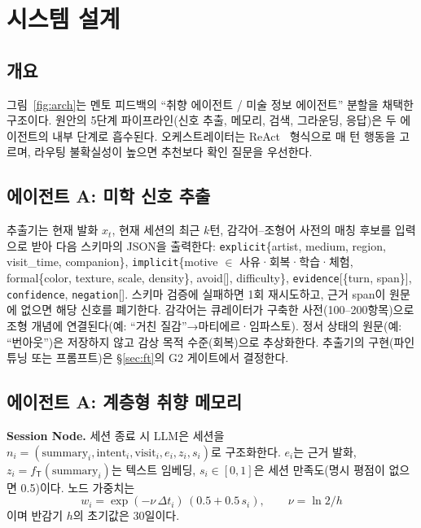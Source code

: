\documentclass[10pt,twocolumn,letterpaper]{article}
\newcommand{\sT}{\mathsf{T}}
\begin{document}
\section{시스템 설계}
\label{sec:system}

\subsection{개요}
그림~\ref{fig:arch}는 멘토 피드백의 ``취향 에이전트 / 미술 정보 에이전트'' 분할을 채택한 구조이다. 원안의 5단계 파이프라인(신호 추출, 메모리, 검색, 그라운딩, 응답)은 두 에이전트의 내부 단계로 흡수된다. 오케스트레이터는 ReAct~\cite{yao2023react} 형식으로 매 턴 행동을 고르며, 라우팅 불확실성이 높으면 추천보다 확인 질문을 우선한다.

\subsection{에이전트 A: 미학 신호 추출}
\label{sec:extract}
추출기는 현재 발화 $x_t$, 현재 세션의 최근 $k$턴, 감각어–조형어 사전의 매칭 후보를 입력으로 받아 다음 스키마의 JSON을 출력한다: \texttt{explicit}\{artist, medium, region, visit\_time, companion\}, \texttt{implicit}\{motive $\in$ 사유·회복·학습·체험, formal\{color, texture, scale, density\}, avoid[], difficulty\}, \texttt{evidence}[\{turn, span\}], \texttt{confidence}, \texttt{negation}[]. 스키마 검증에 실패하면 1회 재시도하고, 근거 span이 원문에 없으면 해당 신호를 폐기한다. 감각어는 큐레이터가 구축한 사전(100–200항목)으로 조형 개념에 연결된다(예: ``거친 질감''→마티에르·임파스토). 정서 상태의 원문(예: ``번아웃'')은 저장하지 않고 감상 목적 수준(회복)으로 추상화한다. 추출기의 구현(파인튜닝 또는 프롬프트)은 §\ref{sec:ft}의 G2 게이트에서 결정한다.

\subsection{에이전트 A: 계층형 취향 메모리}
\label{sec:memory}
\textbf{Session Node.} 세션 종료 시 LLM은 세션을 $n_i=(\mathrm{summary}_i,\mathrm{intent}_i,\mathrm{visit}_i,e_i,z_i,s_i)$로 구조화한다. $e_i$는 근거 발화, $z_i=f_\sT(\mathrm{summary}_i)$는 텍스트 임베딩, $s_i\in[0,1]$은 세션 만족도(명시 평점이 없으면 0.5)이다. 노드 가중치는
\begin{equation}
w_i=\exp(-\nu\,\Delta t_i)\,(0.5+0.5\,s_i),\qquad \nu=\ln 2/h
\label{eq:weight}
\end{equation}
이며 반감기 $h$의 초기값은 30일이다.
\end{document}
